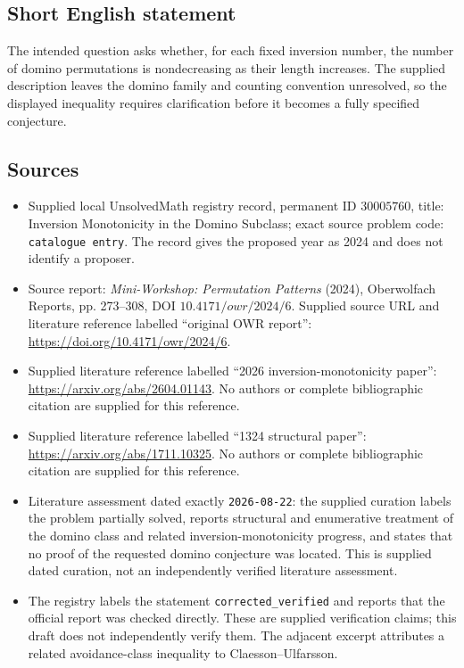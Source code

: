 \documentclass[11pt]{article}
\begin{document}
\subsection{Short English statement}
The intended question asks whether, for each fixed inversion number, the number of domino permutations is nondecreasing as their length increases. The supplied description leaves the domino family and counting convention unresolved, so the displayed inequality requires clarification before it becomes a fully specified conjecture.
\subsection{Sources}
\begin{itemize}
\item Supplied local UnsolvedMath registry record, permanent ID \(30005760\), title: Inversion Monotonicity in the Domino Subclass; exact source problem code: \texttt{catalogue entry}. The record gives the proposed year as 2024 and does not identify a proposer.
\item Source report: \emph{Mini-Workshop: Permutation Patterns} (2024), Oberwolfach Reports, pp. 273--308, DOI \(10.4171/owr/2024/6\). Supplied source URL and literature reference labelled ``original OWR report'': \url{https://doi.org/10.4171/owr/2024/6}.
\item Supplied literature reference labelled ``2026 inversion-monotonicity paper'': \url{https://arxiv.org/abs/2604.01143}. No authors or complete bibliographic citation are supplied for this reference.
\item Supplied literature reference labelled ``1324 structural paper'': \url{https://arxiv.org/abs/1711.10325}. No authors or complete bibliographic citation are supplied for this reference.
\item Literature assessment dated exactly \texttt{2026-08-22}: the supplied curation labels the problem partially solved, reports structural and enumerative treatment of the domino class and related inversion-monotonicity progress, and states that no proof of the requested domino conjecture was located. This is supplied dated curation, not an independently verified literature assessment.
\item The registry labels the statement \texttt{corrected\_verified} and reports that the official report was checked directly. These are supplied verification claims; this draft does not independently verify them. The adjacent excerpt attributes a related avoidance-class inequality to Claesson--Ulfarsson.
\end{itemize}
\end{document}
